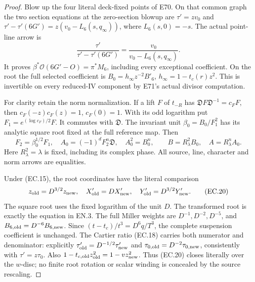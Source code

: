 \begin{proof}
Blow up the four literal deck-fixed points of E70. On that common
graph the two section equations at the zero-section blowup are
\(\tau'=zv_0\) and \(\tau'-\tau'(6G')=z(v_0-L_6(s,q_\infty))\),
where \(L_6(s,0)=-s\). The actual point-line arrow is
\[
 \frac{\tau'}{\tau'-\tau'(6G')}=
          \frac{v_0}{v_0-L_6(s,q_\infty)}.
 \tag{EC.18}
\]
It proves \(\beta^*\mathcal O(6G'-O)=\pi^*M_6\), including every
exceptional coefficient. On the root the full selected coefficient
is \(B_0=h_\infty z^{-2}B'_6\),
\(h_\infty=1-t_c(r)z^2\). This is invertible on every reduced-IV
component by E71's actual divisor computation.

For clarity retain the norm normalization. If a lift \(F\) of
\(t_{-R}\) has \(\mathfrak D F\mathfrak D^{-1}=c_FF\), then
\(c_F(-z)c_F(z)=1\), \(c_F(0)=1\). With its odd logarithm put
\(F_1=e^{(\log c_F)/2}F\). It commutes with \(\mathfrak D\).
The invariant unit \(\beta_0=B_0/F_1^2\) has its analytic square
root fixed at the full reference map. Then
\[
 F_2=\beta_0^{1/2}F_1,\quad
 A_0=(-1)^dF_2^n\mathfrak D,\quad A_0^2=B_0^n,
 \qquad B=R_\lambda^2 B_0,\quad A=R_\lambda^n A_0.
 \tag{EC.19}
\]
Here \(R_\lambda^2=\lambda\) is fixed, including its complex
phase. All source, line, character and norm arrows are equalities.

Under (EC.15), the root coordinates have the literal comparison
\[
 z_{\rm old}=D^{3/2}z_{\rm new},\quad
 X'_{\rm old}=D X'_{\rm new},\quad
 Y'_{\rm old}=D^{3/2}Y'_{\rm new}.
 \tag{EC.20}
\]
The square root uses the fixed logarithm of the unit \(D\).
The transformed root is exactly the equation in EN.3. The full
Miller weights are \(D^{-1},D^{-2},D^{-5}\), and
\(B_{6,\rm old}=D^{-6}B_{6,\rm new}\). Since
\((t-t_c)/t^3=D^6 q/T^3\), the complete suspension coefficient
is unchanged. The Cartier ratio (EC.18) carries both numerator
and denominator: explicitly
\(\tau'_{\rm old}=D^{-1/2}\tau'_{\rm new}\) and
\(\tau_{0,\rm old}=D^{-2}\tau_{0,\rm new}\), consistently with
\(\tau'=z\tau_0\). Also
\(1-t_{c,\rm old}z_{\rm old}^2=1-vz_{\rm new}^2\).
Thus (EC.20) closes literally over the \(w\)-disc;
no finite root rotation or scalar winding is concealed by the
source rescaling.


\end{proof}
